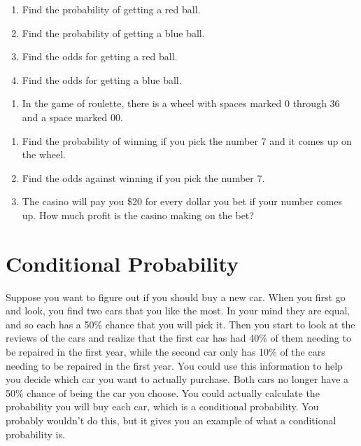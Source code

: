 \documentclass[]{book}
\providecommand{\tightlist}{%
  \setlength{\itemsep}{0pt}\setlength{\parskip}{0pt}}
\begin{document}
\begin{enumerate}
\def\labelenumi{\alph{enumi}.}
\item
  Find the probability of getting a red ball.
\item
  Find the probability of getting a blue ball.
\item
  Find the odds for getting a red ball.
\item
  Find the odds for getting a blue ball.
\end{enumerate}

\begin{enumerate}
\def\labelenumi{\arabic{enumi}.}
\setcounter{enumi}{7}
\tightlist
\item
  In the game of roulette, there is a wheel with spaces marked 0
  through 36 and a space marked 00.
\end{enumerate}

\begin{enumerate}
\def\labelenumi{\alph{enumi}.}
\item
  Find the probability of winning if you pick the number 7 and it
  comes up on the wheel.
\item
  Find the odds against winning if you pick the number 7.
\item
  The casino will pay you \$20 for every dollar you bet if your number
  comes up. How much profit is the casino making on the bet?
\end{enumerate}

\hypertarget{conditional-probability}{%
\section{Conditional Probability}\label{conditional-probability}}

Suppose you want to figure out if you should buy a new car. When you first go and look, you find two cars that you like the most. In your mind they are equal, and so each has a 50\% chance that you will pick it. Then you start to look at the reviews of the cars and realize that the first car has had 40\% of them needing to be repaired in the first year, while the second car only has 10\% of the cars needing to be repaired in the first year. You could use this information to help you decide which car you want to actually purchase. Both cars no longer have a 50\% chance of being the car you choose. You could actually calculate the probability you will buy each car, which is a conditional probability. You probably wouldn't do this, but it gives you an example of what a conditional probability is.
\end{document}
